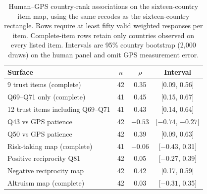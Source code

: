 \begin{table}[htbp]\centering\small
\caption{Human--GPS country-rank associations on the sixteen-country item map, using the same recodes as the sixteen-country rectangle. Rows require at least fifty valid weighted responses per item. Complete-item rows retain only countries observed on every listed item. Intervals are 95\% country bootstrap (2,000 draws) on the human panel and omit GPS measurement error.}\label{tab:human42}
\begin{tabular}{lccc}\toprule
Surface & $n$ & $\rho$ & Interval\\\midrule
9 trust items (complete) & 42 & 0.35 & [0.09, 0.56] \\
Q69--Q71 only (complete) & 41 & 0.45 & [0.15, 0.67] \\
12 trust items including Q69--Q71 & 41 & 0.43 & [0.14, 0.64] \\
Q43 vs GPS patience & 42 & $-0.53$ & [$-0.74$, $-0.27$] \\
Q50 vs GPS patience & 42 & 0.39 & [0.09, 0.63] \\
Risk-taking map (complete) & 41 & $-0.06$ & [$-0.43$, 0.31] \\
Positive reciprocity Q81 & 42 & 0.05 & [$-0.27$, 0.39] \\
Negative reciprocity map & 42 & 0.42 & [0.17, 0.59] \\
Altruism map (complete) & 42 & 0.03 & [$-0.31$, 0.35] \\
\bottomrule
\end{tabular}
\end{table}
